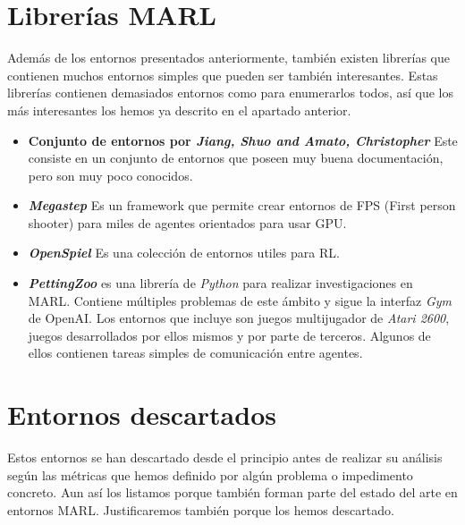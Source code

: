 \section{Librerías MARL}
Además de los entornos presentados anteriormente, también existen librerías que contienen muchos entornos simples que pueden ser también interesantes. Estas librerías contienen demasiados entornos como para enumerarlos todos, así que los más interesantes los hemos ya descrito en el apartado anterior.

\begin{itemize}
	\item \textbf{Conjunto de entornos por \textit{Jiang, Shuo and Amato, Christopher}} \cite {jiang-repo} Este consiste en un conjunto de entornos que poseen muy buena documentación, pero son muy poco conocidos.

	\item \textbf{\textit{Megastep}} \cite {megastep-repo} Es un framework que permite crear entornos de FPS (First person shooter) para miles de agentes orientados para usar GPU.

	\item \textbf{\textit{OpenSpiel}} \cite {openspiel-repo} Es una colección de entornos utiles para RL.

	\item \textbf{\textit{PettingZoo}} \cite {petting-repo} es una librería de \textit{Python} para realizar investigaciones en MARL. Contiene múltiples problemas de este ámbito y sigue la interfaz \textit{Gym} de OpenAI. Los entornos que incluye son juegos multijugador de \textit{Atari 2600}, juegos desarrollados por ellos mismos y por parte de terceros. Algunos de ellos contienen tareas simples de comunicación entre agentes.\cite {env-list}


\end{itemize}

\section{Entornos descartados}
Estos entornos se han descartado desde el principio antes de realizar su análisis según las métricas que hemos definido por algún problema o impedimento concreto. Aun así los listamos porque también forman parte del estado del arte en entornos MARL. Justificaremos también porque los hemos descartado.

